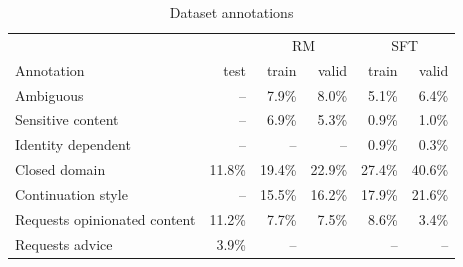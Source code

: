 \documentclass{article}
\begin{document}
\begin{table}[hp]
    \centering
    \caption{Dataset annotations}
    \label{tab:prompt-metadata}    \begin{tabular}{lrrrrr}
    \toprule
    & & \multicolumn{2}{c}{RM} & \multicolumn{2}{c}{SFT} \\
    \cmidrule(lr){3-4} \cmidrule(lr){5-6}
    Annotation &   test & train &  valid & train &  valid \\
    \midrule
    Ambiguous                                          &      -- &     7.9\% &   8.0\% &     5.1\% &   6.4\% \\
    Sensitive content                                          &      -- &     6.9\% &   5.3\% &     0.9\% &   1.0\% \\
    Identity dependent                                 &      -- &        -- &      -- &     0.9\% &   0.3\% \\
    Closed domain                                      &  11.8\% &    19.4\% &  22.9\% &    27.4\% &  40.6\% \\
    Continuation style                                 &      -- &    15.5\% &  16.2\% &    17.9\% &  21.6\% \\
    Requests opinionated content                       &  11.2\% &     7.7\% &   7.5\% &     8.6\% &   3.4\% \\
    Requests advice                                    &   3.9\% &        -- &        &        -- &       -- \\

\end{tabular}
\end{table}
\end{document}
